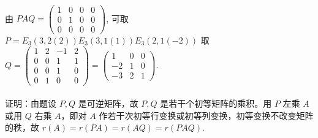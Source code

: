 	 \paragraph{} %
		 由 $PAQ = \begin{pmatrix}
				 1 & 0 & 0 & 0 \\
				 0 & 1 & 0 & 0 \\
				 0 & 0 & 0 & 0
			 \end{pmatrix}$, 可取 $P = E_3(3,2(2))E_3(3,1(1))E_3(2,1(-2))$
		 取 $Q = \begin{pmatrix}
				 1 & 2 & -1 & 2 \\
				 0 & 0 & 1  & 1 \\
				 0 & 0 & 1  & 0 \\
				 0 & 1 & 0  & 0
			 \end{pmatrix} = \begin{pmatrix}
				 1  & 0 & 0 \\
				 -2 & 1 & 0 \\
				 -3 & 2 & 1
			 \end{pmatrix}$.


	 \paragraph{} %
		 证明：由题设 $P, Q$ 是可逆矩阵，故 $P, Q$ 是若干个初等矩阵的乘积。用 $P$ 左乘 $A$ 或用 $Q$ 右乘 $A$，即对 $A$ 作若干次初等行变换或初等列变换，初等变换不改变矩阵的秩，故 $r(A) = r(PA) = r(AQ) = r(PAQ)$.


